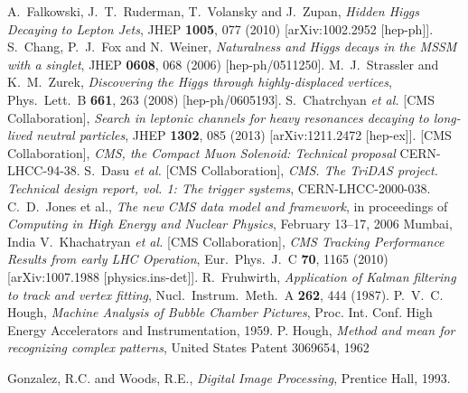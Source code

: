 \documentclass{JINST}
\begin{document}
\begin{thebibliography}{9}
%
%
  A.~Falkowski, J.~T.~Ruderman, T.~Volansky and J.~Zupan,
  \emph{Hidden Higgs Decaying to Lepton Jets},
  JHEP {\bf 1005}, 077 (2010)
  [arXiv:1002.2952 [hep-ph]].
%
%
  S.~Chang, P.~J.~Fox and N.~Weiner,
  \emph{Naturalness and Higgs decays in the MSSM with a singlet},
  JHEP {\bf 0608}, 068 (2006)
  [hep-ph/0511250].
%
%
  M.~J.~Strassler and K.~M.~Zurek,
\emph{Discovering the Higgs through highly-displaced vertices},
  Phys.\ Lett.\ B {\bf 661}, 263 (2008)
  [hep-ph/0605193].
%
%
  S.~Chatrchyan {\it et al.}  [CMS Collaboration],
  \emph{Search in leptonic channels for heavy resonances decaying to long-lived neutral particles},
  JHEP {\bf 1302}, 085 (2013)
  [arXiv:1211.2472 [hep-ex]].
%
%
  [CMS Collaboration],
\emph{CMS, the Compact Muon Solenoid: Technical proposal}
  CERN-LHCC-94-38.
%
%
  S.~Dasu {\it et al.}  [CMS Collaboration],
\emph{CMS. The TriDAS project. Technical design report, vol. 1: The trigger systems},
  CERN-LHCC-2000-038.
%
%
C.~D.~Jones et al.,
\emph{The new CMS data model and framework}, in proceedings of
 \emph{Computing in High Energy and Nuclear Physics}, 
February 13--17, 2006 Mumbai, India
%
%
  V.~Khachatryan {\it et al.}  [CMS Collaboration],
  \emph{CMS Tracking Performance Results from early LHC Operation},
  Eur.\ Phys.\ J.\ C {\bf 70}, 1165 (2010)
  [arXiv:1007.1988 [physics.ins-det]].
%
%
  R.~Fruhwirth,
  \emph{Application of Kalman filtering to track and vertex fitting},
  Nucl.\ Instrum.\ Meth.\ A {\bf 262}, 444 (1987).
%
P.~V.~C. Hough, 
\emph{Machine Analysis of Bubble Chamber Pictures}, 
Proc. Int. Conf. High Energy Accelerators and Instrumentation, 1959.
%
%
 P. Hough,
\emph{Method and mean for recognizing complex patterns}, 
United States Patent 3069654, 1962

 Gonzalez, R.C. and Woods, R.E., 
\emph{Digital Image Processing},
Prentice Hall, 1993.



\end{thebibliography}
\end{document}
